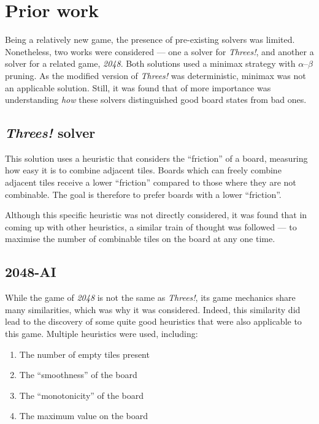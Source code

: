 \documentclass[a4paper, 11pt, titlepage]{report}
\newcommand{\threes}{\emph{Threes!}}
\begin{document}
\section{Prior work}\label{section:prior-work}
Being a relatively new game, the presence of pre-existing solvers was limited. Nonetheless, two works were considered --- one a solver for \threes{}\cite{tsolver}, and another a solver for a related game, \emph{2048}\cite{2048solver}. Both solutions used a minimax strategy with $\alpha$--$\beta$ pruning. As the modified version of \threes{} was deterministic, minimax was not an applicable solution. Still, it was found that of more importance was understanding \emph{how} these solvers distinguished good board states from bad ones.

\subsection{\threes{} solver} \label{threes-solver}
This solution uses a heuristic that considers the ``friction'' of a board, measuring how easy it is to combine adjacent tiles\cite{tsolver}. Boards which can freely combine adjacent tiles receive a lower ``friction'' compared to those where they are not combinable. The goal is therefore to prefer boards with a lower ``friction''.

Although this specific heuristic was not directly considered, it was found that in coming up with other heuristics, a similar train of thought was followed --- to maximise the number of combinable tiles on the board at any one time.

\subsection{2048-AI}\label{2048-solver}
While the game of \emph{2048} is not the same as \threes{}, its game mechanics share many similarities, which was why it was considered. Indeed, this similarity did lead to the discovery of some quite good heuristics that were also applicable to this game. Multiple heuristics were used, including:
\begin{enumerate}
	\singlespacing
	\item{The number of empty tiles present}
	\item{The ``smoothness'' of the board}
	\item{The ``monotonicity'' of the board}
	\item{The maximum value on the board}
	\onehalfspacing
\end{enumerate}
\end{document}
